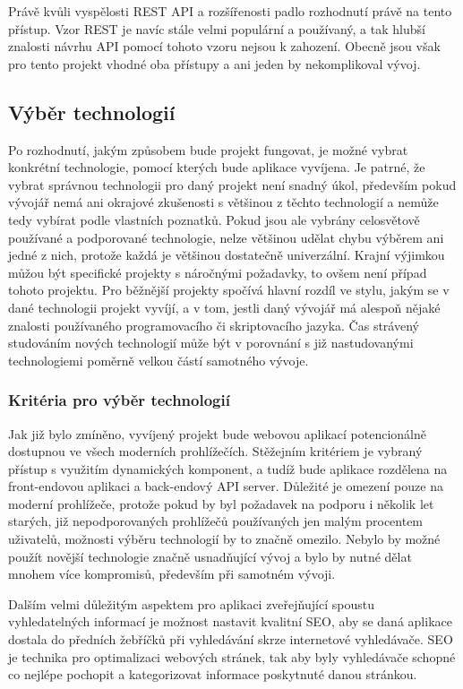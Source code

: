 	Právě kvůli vyspělosti \ac{REST} \ac{API} a rozšířenosti padlo rozhodnutí právě na tento přístup.
	Vzor \ac{REST} je navíc stále velmi populární a používaný, a tak hlubší znalosti návrhu \ac{API} pomocí tohoto vzoru
	nejsou k zahození.
	Obecně jsou však pro tento projekt vhodné oba přístupy a ani jeden by nekomplikoval vývoj.

	\subsection{Výběr technologií}

	Po rozhodnutí, jakým způsobem bude projekt fungovat, je možné vybrat konkrétní technologie,
	pomocí kterých bude aplikace vyvíjena.
	Je patrné, že vybrat správnou technologii pro daný projekt není snadný úkol, především pokud vývojář
	nemá ani okrajové zkušenosti s většinou z těchto technologií a nemůže tedy vybírat podle vlastních poznatků.
	Pokud jsou ale vybrány celosvětově používané a podporované technologie, nelze většinou udělat chybu výběrem ani
	jedné z nich, protože každá je většinou dostatečně univerzální.
	Krajní výjimkou můžou být specifické projekty s náročnými požadavky,
	to ovšem není případ tohoto projektu.
	Pro běžnější projekty spočívá hlavní rozdíl ve stylu, jakým se v dané technologii
	projekt vyvíjí, a v tom, jestli daný vývojář má alespoň nějaké znalosti používaného programovacího či skriptovacího jazyka.
	Čas strávený studováním nových technologií může být v porovnání s již nastudovanými technologiemi
	poměrně velkou částí samotného vývoje.

		\subsubsection{Kritéria pro výběr technologií}

		Jak již bylo zmíněno, vyvíjený projekt bude webovou aplikací potencionálně dostupnou ve všech moderních prohlížečích.
		Stěžejním kritériem je vybraný přístup s využitím dynamických komponent, a tudíž bude aplikace rozdělena
		na front-endovou aplikaci a back-endový \ac{API} server.
		Důležité je omezení pouze na moderní prohlížeče, protože pokud by byl požadavek na podporu i několik let starých,
		již nepodporovaných prohlížečů používaných jen malým procentem uživatelů, možnosti výběru technologií by to značně
		omezilo.
		Nebylo by možné použít novější technologie značně usnadňující vývoj a bylo by nutné dělat mnohem více kompromisů,
		především při samotném vývoji.

		Dalším velmi důležitým aspektem pro aplikaci zveřejňující spoustu vyhledatelných informací je možnost nastavit
		kvalitní \ac{SEO}, aby se daná aplikace dostala do předních žebříčků při vyhledávání skrze internetové
		vyhledávače.
		\Ac{SEO} je technika pro optimalizaci webových stránek, tak aby byly vyhledávače schopné co
		nejlépe pochopit a kategorizovat informace poskytnuté
		danou stránkou. \cite{what_is_seo}

